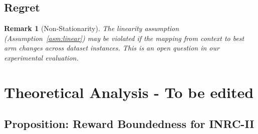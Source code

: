 \documentclass[11pt]{article}
\newtheorem{remark}{Remark}
\begin{document}
\subsection{Regret}


\begin{remark}[Non-Stationarity]
  The linearity assumption (Assumption~\ref{asm:linear}) may be
  violated if the mapping from context to best arm changes across
  dataset instances. This is an open question in our experimental
  evaluation.
\end{remark}


\section{Theoretical Analysis - To be edited} 

%
%


\subsection{Proposition: Reward Boundedness for INRC-II}
\end{document}
